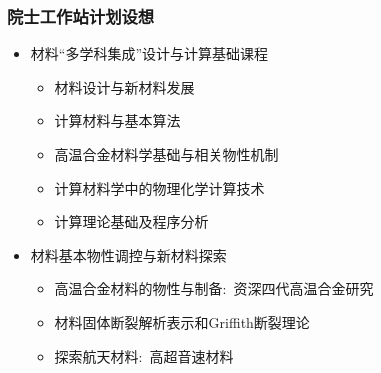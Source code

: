 \small
\frame
{
	\frametitle{院士工作站计划设想}
	\begin{itemize}
		\item 材料``多学科集成''设计与计算基础课程
			\begin{itemize}
				\item 材料设计与新材料发展
				\item 计算材料与基本算法
				\item 高温合金材料学基础与相关物性机制
				\item 计算材料学中的物理化学计算技术
				\item 计算理论基础及程序分析
			\end{itemize}
		\item 材料基本物性调控与新材料探索
			\begin{itemize}
				\item 高温合金材料的物性与制备:~资深四代高温合金研究
				\item 材料固体断裂解析表示和\textrm{Griffith}断裂理论
				\item 探索航天材料:~高超音速材料
			\end{itemize}
	\end{itemize}
}

